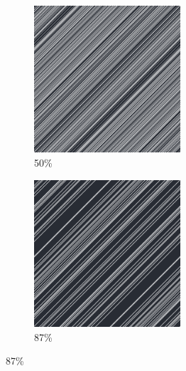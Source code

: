 \documentclass[12pt, fleqn]{report}                             %
\theoremstyle{break}                                            %
\begin{document}
\begin{figure}[ht!]
\begin{subfigure}[b]{0.4\linewidth}
          \includegraphics[width=0.6\textwidth]{Images/42/c.png}
          \caption{50\%}
        \end{subfigure}
        \begin{subfigure}[b]{0.4\linewidth}
          \includegraphics[width=0.6\textwidth]{Images/42/d.png}
          \caption{87\%}
        \end{subfigure}
      \end{figure}
\end{document}
